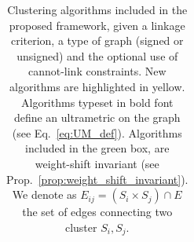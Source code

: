 \begin{table}[t]
\begin{subtable}[t!]{\textwidth}
\begin{tabular}{l |c  c  c  c  c}
            
             


             





        \end{tabular}
    \end{subtable} 
    \caption{Clustering algorithms included in the proposed \algname{} framework, given a linkage criterion, a type of graph (signed or unsigned) and the optional use of cannot-link constraints. New algorithms are highlighted in yellow. Algorithms typeset in bold font define an ultrametric on the graph (see Eq.~\ref{eq:UM_def}). Algorithms included in the green box, are weight-shift invariant (see Prop.~\ref{prop:weight_shift_invariant}). 
    We denote as $E_{ij}=(S_i \times S_{j}) \cap E$ the set of edges connecting two cluster $S_i, S_j$. } 
    \label{tab:linkage-criteria}
\end{table}


